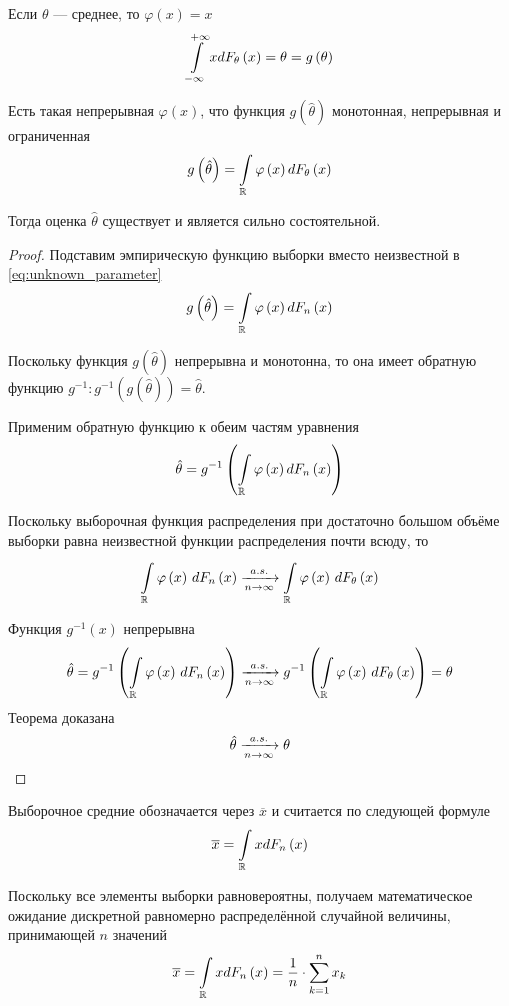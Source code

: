 \begin{example} Если $\theta$ --- среднее, то $\varphi\left(x\right)=x$
$$\int\limits_{-\infty}^{+\infty}xd\cdfof{\theta}{x}
    =\theta=g\left(\theta\right)$$
\end{example}
\begin{theorem}
    Есть такая непрерывная $\varphi\left( x \right)$, что функция
    $g\left( \hat{\theta} \right)$ монотонная, непрерывная и ограниченная
    \cite[с.~87]{BorovkovMS}
    \begin{equation}\label{eq:unknown_parameter}
        g\left(\hat{\theta}\right)
            =\int\limits_{\mathbb{R}}\varphi\left(x\right)d\cdfof{\theta}{x}
    \end{equation}

    Тогда оценка $\hat{\theta}$ существует и является сильно состоятельной.
\end{theorem}
\begin{proof}
    Подставим эмпирическую функцию выборки вместо неизвестной в
    \eqref{eq:unknown_parameter}
    $$g\left(\hat{\theta}\right)
            =\int\limits_{\mathbb{R}}\varphi\left(x\right)d\cdfn{x}$$

    Поскольку функция $g\left(\hat{\theta}\right)$ непрерывна и монотонна,
    то она имеет обратную функцию
    $g^{-1}:g^{-1}\left(g\left(\hat{\theta}\right)\right)=\hat{\theta}$.

    Применим обратную функцию к обеим частям уравнения
    $$\hat{\theta}
            =g^{-1}\left(
                \int\limits_{\mathbb{R}}\varphi\left(x\right)d\cdfn{x}\right)$$

    Поскольку выборочная функция распределения при достаточно большом объёме
    выборки равна неизвестной функции распределения почти всюду, то
    $$\integrall{\mathbb{R}}{d\cdfn{x}}{\varphi\left( x \right)}
        \acovergence
            \integrall{\mathbb{R}}{d\cdfof{\theta}{x}}{
                \varphi\left( x \right)}$$

    Функция $g^{-1}\left(x\right)$ непрерывна
    $$\hat{\theta}
        = g^{-1}\left( \integrall{\mathbb{R}}{
            d\cdfn{x}}{\varphi\left( x \right)} \right)
        \acovergence
            g^{-1}\left( \integrall{\mathbb{R}}{
                d\cdfof{\theta}{x}}{\varphi\left( x \right)} \right)
            = \theta$$
    Теорема доказана
    $$\hat{\theta}\acovergence\theta$$
\end{proof}
\begin{definition}
    Выборочное средние обозначается через $\overline{x}$
    и считается по следующей формуле
    $$\overline{x}=\int\limits_{\mathbb{R}}xd\cdfn{x}$$

    Поскольку все элементы выборки равновероятны,
    получаем математическое ожидание
    дискретной равномерно распределённой случайной величины,
    принимающей $n$ значений
    $$\overline{x}=\int\limits_{\mathbb{R}}xd\cdfn{x}
        =\frac{1}{n}\cdot\sum_{k=1}^n x_k$$
\end{definition}
